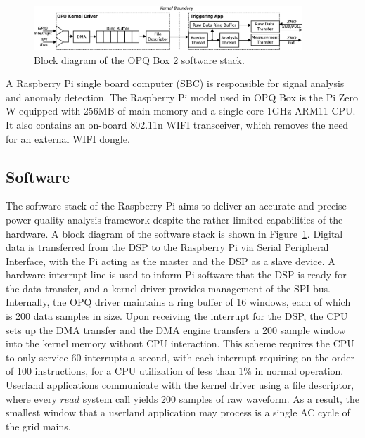 \begin{figure}[ht]
  \begin{center}
  \includegraphics[width=0.9\textwidth]{images/opq-box/opqbox_software.png}
  \end{center}
  \caption{Block diagram of the OPQ Box 2 software stack.}
  \label{fig:opq:3}
\end{figure}

A Raspberry Pi single board computer (SBC) is responsible for signal analysis and anomaly detection.
The Raspberry Pi model used in OPQ Box is the Pi Zero W equipped with 256MB of main memory and a single core 1GHz ARM11 CPU. It also contains an on-board 802.11n WIFI transceiver, which removes the need for an external WIFI dongle.

\subsection{Software}\label{subsec:software}

The software stack of the Raspberry Pi aims to deliver an accurate and precise power quality analysis framework despite the rather limited capabilities of the hardware.
A block diagram of the software stack is shown in Figure~\ref{fig:opq:3}.
Digital data is transferred from the DSP to the Raspberry Pi via Serial Peripheral Interface, with the Pi acting as the master and the DSP as a slave device.
A hardware interrupt line is used to inform Pi software that the DSP is ready for the data transfer, and a kernel driver provides management of the SPI bus.
Internally, the OPQ driver maintains a ring buffer of 16 windows, each of which is 200 data samples in size.
Upon receiving the interrupt for the DSP, the CPU sets up the DMA transfer and the DMA engine transfers a 200 sample window into the kernel memory without CPU interaction.
This scheme requires the CPU to only service 60 interrupts a second, with each interrupt requiring on the order of 100 instructions, for a CPU utilization of less than $1\%$ in normal operation.
Userland applications communicate with the kernel driver using a file descriptor, where every $read$ system call yields 200 samples of raw waveform.
As a result, the smallest window that a userland application may process is a single AC cycle of the grid mains.

